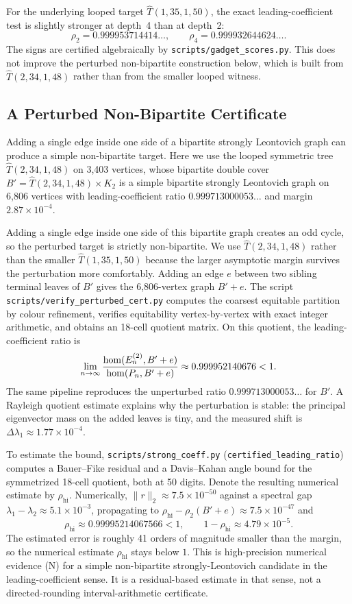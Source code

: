 For the underlying looped target $\hat T(1,35,1,50)$, the exact
leading-coefficient test is slightly stronger at depth~4 than at depth~2:
\[
  \rho_2=0.999953714414\ldots,\qquad
  \rho_4=0.999932644624\ldots.
\]
The signs are certified algebraically by
\texttt{scripts/gadget\_scores.py}. This does not improve the perturbed
non-bipartite construction below, which is built from
$\hat T(2,34,1,48)$ rather than from the smaller looped witness.

\subsection{A Perturbed Non-Bipartite Certificate}

Adding a single edge inside one side of a bipartite strongly Leontovich
graph can produce a simple non-bipartite target. Here we use the looped
symmetric tree $\hat{T}(2, 34, 1, 48)$ on 3,403 vertices, whose
bipartite double cover $B' = \hat{T}(2, 34, 1, 48) \times K_2$ is a
simple bipartite strongly Leontovich graph on 6,806 vertices with
leading-coefficient ratio $0.999713000053\ldots$ and margin
$2.87 \times 10^{-4}$.

Adding a single edge inside one side of this bipartite graph creates an odd
cycle, so the perturbed target is strictly non-bipartite. We use
$\hat{T}(2, 34, 1, 48)$ rather than the smaller $\hat{T}(1,35,1,50)$ because
the larger asymptotic margin survives the perturbation more comfortably.
Adding an edge $e$ between two sibling terminal leaves of $B'$ gives the
6,806-vertex graph $B' + e$. The script
\texttt{scripts/verify\_perturbed\_cert.py} computes the coarsest equitable
partition by colour refinement, verifies equitability vertex-by-vertex with
exact integer arithmetic, and obtains an 18-cell quotient matrix. On this
quotient, the leading-coefficient ratio is
\[
  \lim_{n \to \infty}
  \frac{\mathrm{hom}(E_n^{(2)}, B' + e)}{\mathrm{hom}(P_n, B' + e)}
  \approx 0.999952140676 < 1.
\]
The same pipeline reproduces the unperturbed ratio
$0.999713000053\ldots$ for $B'$. A Rayleigh quotient estimate explains
why the perturbation is stable: the principal eigenvector mass on the
added leaves is tiny, and the measured shift is
$\Delta\lambda_1 \approx 1.77 \times 10^{-4}$.

To estimate the bound, \texttt{scripts/strong\_coeff.py}
(\texttt{certified\_leading\_ratio}) computes a Bauer--Fike residual
and a Davis--Kahan angle bound for the symmetrized 18-cell quotient,
both at 50 digits. Denote the resulting numerical estimate by
$\rho_{\mathrm{hi}}$. Numerically,
$\|r\|_2 \approx 7.5\times 10^{-50}$ against a spectral gap
$\lambda_1 - \lambda_2 \approx 5.1\times 10^{-3}$, propagating to
$\rho_{\mathrm{hi}} - \rho_2(B'+e) \approx 7.5\times 10^{-47}$ and
\[
  \rho_{\mathrm{hi}} \approx 0.99995214067566 < 1,
  \qquad 1 - \rho_{\mathrm{hi}} \approx 4.79\times 10^{-5}.
\]
The estimated error is roughly 41 orders of magnitude smaller than the
margin, so the numerical estimate $\rho_{\mathrm{hi}}$ stays below $1$. This is
high-precision numerical evidence (N) for a simple non-bipartite
strongly-Leontovich candidate in the leading-coefficient sense. It is a
residual-based estimate in that sense, not a directed-rounding
interval-arithmetic certificate.

